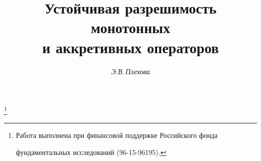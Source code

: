 









\newcommand{\tts}[1]{}


\renewcommand{\baselinestretch}{0.95}







\setcounter{page}{72}















\author{\it Э.В.\,Плехова}




\title{Устойчивая разрешимость монотонных\\ и аккретивных операторов}


\thanks{Работа выполнена при финансовой поддержке Российского фонда


фундаментальных исследований (96-15-96195).}





\date{}




\pagestyle{plain} %







\maketitle


